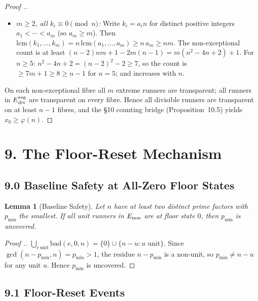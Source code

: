 \documentclass[11pt,a4paper]{article}
\theoremstyle{plain}
\newtheorem{lemma}[theorem]{Lemma}
\theoremstyle{definition}
\theoremstyle{remark}
\begin{document}
\begin{proof}[Proof .]
\begin{itemize}
\item \textit{$m \geq 2$, all $k_i \equiv 0 \pmod{n}$:} Write $k_i = a_i n$ for distinct positive integers $a_1 < \cdots < a_m$ (so $a_m \geq m$). Then $\mathrm{lcm}(k_1,\ldots,k_m)=n\,\mathrm{lcm}(a_1,\ldots,a_m)\geq n\,a_m\geq nm$. The non-exceptional count is at least $(n-2)nm+1-2m(n-1)=m(n^2-4n+2)+1$. For $n\geq 5$: $n^2-4n+2=(n-2)^2-2\geq 7$, so the count is $\geq 7m+1\geq 8\geq n-1$ for $n=5$; and increases with $n$. \checkmark
\end{itemize}

On each non-exceptional fibre all $m$ extreme runners are transparent; all runners in $E_{\rm div}^{\rm reg}$ are transparent on every fibre. Hence all divisible runners are transparent on at least $n-1$ fibres, and the §10 counting bridge (Proposition~10.5) yields $x_0 \geq \varphi(n)$.
\end{proof}


\medskip



\section{9. The Floor-Reset Mechanism}



\subsection{9.0 Baseline Safety at All-Zero Floor States}



\begin{lemma}[Baseline Safety]
Let $n$ have at least two distinct prime factors with $p_{\min}$ the smallest. If all unit runners in $E_{\rm non}$ are at floor state $0$, then $p_{\min}$ is uncovered.

\end{lemma}

\begin{proof}[Proof .]
$\bigcup_{e\,\text{unit}} \mathrm{bad}(e,0,n) = \{0\} \cup \{n-u : u\text{ unit}\}$. Since $\gcd(n-p_{\min}, n) = p_{\min} > 1$, the residue $n-p_{\min}$ is a non-unit, so $p_{\min} \neq n - u$ for any unit $u$. Hence $p_{\min}$ is uncovered.
\end{proof}


\subsection{9.1 Floor-Reset Events}
\end{document}
